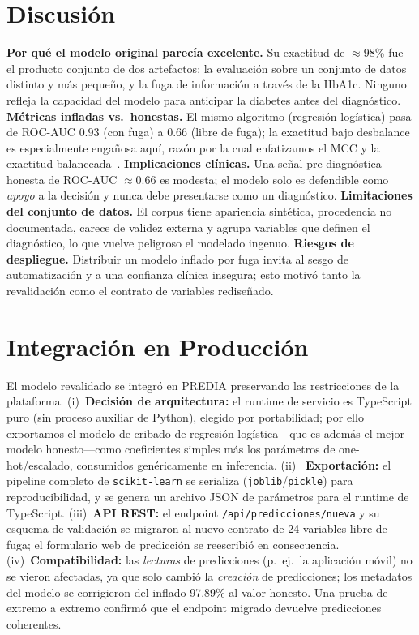 \documentclass[conference]{IEEEtran}
\begin{document}
\section{Discusión}
\textbf{Por qué el modelo original parecía excelente.} Su exactitud de
$\approx$98\% fue el producto conjunto de dos artefactos: la evaluación sobre un
conjunto de datos distinto y más pequeño, y la fuga de información a través de la
HbA1c. Ninguno refleja la capacidad del modelo para anticipar la diabetes antes
del diagnóstico.
\textbf{Métricas infladas vs.\ honestas.} El mismo algoritmo (regresión
logística) pasa de ROC-AUC $0.93$ (con fuga) a $0.66$ (libre de fuga); la
exactitud bajo desbalance es especialmente engañosa aquí, razón por la cual
enfatizamos el MCC y la exactitud balanceada~\cite{chicco2020mcc}.
\textbf{Implicaciones clínicas.} Una señal pre-diagnóstica honesta de ROC-AUC
$\approx$0.66 es modesta; el modelo solo es defendible como \emph{apoyo} a la
decisión y nunca debe presentarse como un diagnóstico.
\textbf{Limitaciones del conjunto de datos.} El corpus tiene apariencia
sintética, procedencia no documentada, carece de validez externa y agrupa
variables que definen el diagnóstico, lo que vuelve peligroso el modelado
ingenuo.
\textbf{Riesgos de despliegue.} Distribuir un modelo inflado por fuga invita al
sesgo de automatización y a una confianza clínica insegura; esto motivó tanto la
revalidación como el contrato de variables rediseñado.

\section{Integración en Producción}
El modelo revalidado se integró en PREDIA preservando las restricciones de la
plataforma. (i)~\textbf{Decisión de arquitectura:} el runtime de servicio es
TypeScript puro (sin proceso auxiliar de Python), elegido por portabilidad; por
ello exportamos el modelo de cribado de regresión logística---que es además el
mejor modelo honesto---como coeficientes simples más los parámetros de
one-hot/escalado, consumidos genéricamente en inferencia. (ii)~\textbf{
Exportación:} el pipeline completo de \texttt{scikit-learn} se serializa
(\texttt{joblib}/\texttt{pickle}) para reproducibilidad, y se genera un archivo
JSON de parámetros para el runtime de TypeScript. (iii)~\textbf{API REST:} el
endpoint \texttt{/api/predicciones/nueva} y su esquema de validación se migraron
al nuevo contrato de 24 variables libre de fuga; el formulario web de predicción
se reescribió en consecuencia. (iv)~\textbf{Compatibilidad:} las \emph{lecturas}
de predicciones (p.\ ej.\ la aplicación móvil) no se vieron afectadas, ya que
solo cambió la \emph{creación} de predicciones; los metadatos del modelo se
corrigieron del inflado 97.89\% al valor honesto. Una prueba de extremo a
extremo confirmó que el endpoint migrado devuelve predicciones coherentes.
\end{document}
